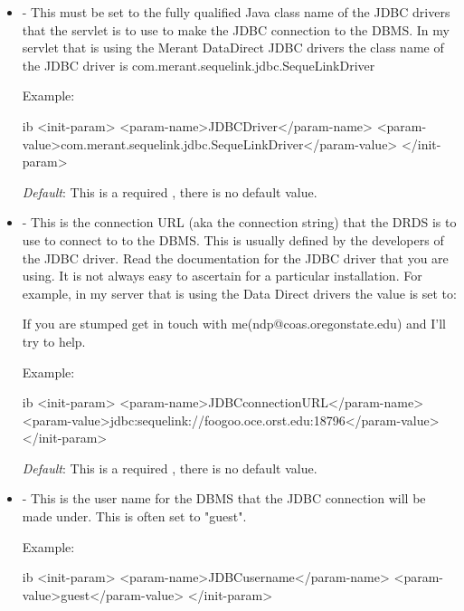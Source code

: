 \documentclass{dods-book}
\begin{document}
\begin{itemize}

\item {} - This must be set to the fully qualified Java class name of the 
JDBC drivers that the servlet is to use to make the JDBC connection to the DBMS. 
In my servlet that is using the Merant DataDirect JDBC drivers the class name of 
the JDBC driver is com.merant.sequelink.jdbc.SequeLinkDriver

Example:
\begin{vcode}{ib}
    <init-param>
        <param-name>JDBCDriver</param-name>
        <param-value>com.merant.sequelink.jdbc.SequeLinkDriver</param-value>
    </init-param>
\end{vcode}
          
\emph{Default}: This is a required , there is no default value. 



\item {} - This is the connection URL (aka the connection 
string) that the DRDS is to use to connect to to the DBMS. This is usually defined 
by the developers of the JDBC driver. Read the documentation for the JDBC driver
that you are using. It is not always easy to ascertain for a particular installation. For 
example, in my server that is using the Data Direct drivers the value is set to:


If you are stumped get in touch with 
me(ndp@coas.oregonstate.edu) and I'll try to help.

Example:

\begin{vcode}{ib}
    <init-param>
        <param-name>JDBCconnectionURL</param-name>
        <param-value>jdbc:sequelink://foogoo.oce.orst.edu:18796</param-value>
    </init-param>
\end{vcode}
          
\emph{Default}: This is a required , there is no default value. 



\item {} - This is the user name for the DBMS that the JDBC connection 
will be made under. This is often set to "guest".

Example:

\begin{vcode}{ib}
    <init-param>
        <param-name>JDBCusername</param-name>
        <param-value>guest</param-value>
    </init-param>
\end{vcode}
          

\end{itemize}
\end{document}

